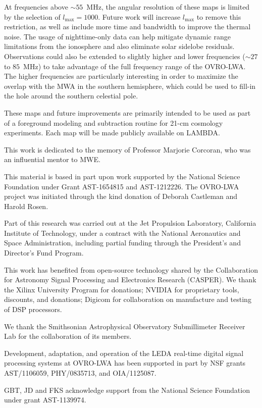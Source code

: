 \documentclass[twocolumn]{aastex61}
\begin{document}
At frequencies above $\sim55$~MHz, the angular resolution of these maps is limited by the selection
of $l_\text{max}=1000$. Future work will increase $l_\text{max}$ to remove this restriction, as well
as include more time and bandwidth to improve the thermal noise. The usage of nighttime-only data
can help mitigate dynamic range limitations from the ionosphere and also eliminate solar sidelobe
residuals. Observations could also be extended to slightly higher and lower frequencies ($\sim27$ to
$85$~MHz) to take advantage of the full frequency range of the OVRO-LWA. The higher frequencies are
particularly interesting in order to maximize the overlap with the MWA in the southern hemisphere,
which could be used to fill-in the hole around the southern celestial pole.

These maps and future improvements are primarily intended to be used as part of a foreground
modeling and subtraction routine for 21-cm cosmology experiments. Each map will be made publicly
available on LAMBDA.

\acknowledgments
This work is dedicated to the memory of Professor Marjorie Corcoran, who was an influential mentor
to MWE.

This material is based in part upon work supported by the National Science Foundation under Grant
AST-1654815 and AST-1212226. The OVRO-LWA project was initiated through the kind donation of Deborah
Castleman and Harold Rosen.

Part of this research was carried out at the Jet Propulsion Laboratory, California Institute of
Technology, under a contract with the National Aeronautics and Space Administration, including
partial funding through the President's and Director's Fund Program.

This work has benefited from open-source technology shared by the Collaboration for Astronomy Signal
Processing and Electronics Research (CASPER).  We thank the Xilinx University Program for donations;
NVIDIA for proprietary tools, discounts, and donations; Digicom for collaboration on manufacture and
testing of DSP processors.

We thank the Smithsonian Astrophysical Observatory Submillimeter Receiver Lab for the collaboration
of its members.

Development, adaptation, and operation of the LEDA real-time digital signal processing systems at
OVRO-LWA has been supported in part by NSF grants AST/1106059, PHY/0835713, and OIA/1125087.

GBT, JD and FKS acknowledge support from the National Science Foundation under grant AST-1139974.



\end{document}
